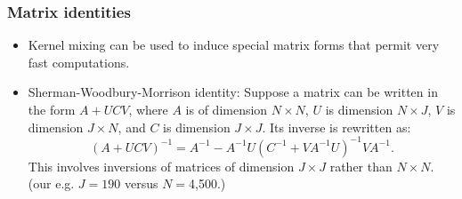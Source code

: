 \documentclass{beamer}
\begin{document}
\begin{frame}
\frametitle{Matrix identities  }
\begin{itemize}
\item Kernel mixing can be used to induce special matrix forms that
  permit very fast computations. %
\item Sherman-Woodbury-Morrison identity: Suppose a matrix can be
  written in the form $A+U C V$, where $A$ is of dimension $N \times
  N$, $U$ is dimension $N \times J$, $V$ is dimension $J \times N$,
  and $C$ is dimension $J \times J$.  Its inverse is rewritten as:   $$(A+U C V)^{-1}=A^{-1}-A^{-1} U (C^{-1}+V A^{-1} U)^{-1} V A^{-1}.
  $$
  This involves inversions of matrices of dimension $J\times J$
  rather than $N\times N$. (our e.g. $J=190$ versus $N=$4,500.)
 \end{itemize}
 \end{frame}


\end{document}
